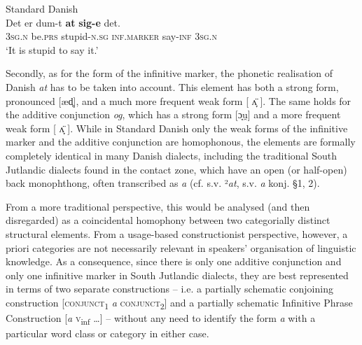 \documentclass[output=paper]{langsci/langscibook}
\begin{document}
\ea\label{ex:hoeder:9}
	Standard Danish\\
	\gll Det er dum-t \textbf{at} \textbf{sig-e} det.\\
     3\textsc{sg.n} be.\textsc{prs} stupid-\textsc{n.sg} \textsc{inf.marker} say-\textsc{inf} 3\textsc{sg.n}\\
	\glt `It is stupid to say it.'
\z

Secondly, as for the form of the infinitive marker, the phonetic realisation of Danish \textit{at} has to be taken into account. This element has both a strong form, pronounced {[}æd̥{]}, and a much more frequent weak form
[%
 ʌ̞̈%
]. The same holds for the additive conjunction \textit{og}, which has a strong form {[}ɔ̞u̯{]} and a more frequent weak form
[%
 ʌ̞̈%
].
While in Standard Danish only the weak forms of the infinitive marker and the additive conjunction are homophonous, the elements are formally completely identical in many Danish dialects, including the traditional South Jutlandic dialects found in the contact zone, which have an open (or half-open) back monophthong, often transcribed as \textit{a} (cf. \citealt{Rasmussen.1965} s.v. ²\textit{at}, \citealt{BjerrumBjerrum1974} s.v. \textit{a} konj. \S 1, 2).

From a more traditional perspective, this would be analysed (and then disregarded) as a coincidental homophony between two categorially distinct structural elements. From a usage-based constructionist perspective, however, a priori categories are not necessarily relevant in speakers’ organisation of linguistic knowledge. As a consequence, since there is only one additive conjunction and only one infinitive marker in South Jutlandic dialects, they are best represented in terms of two separate constructions – i.e. a partially schematic conjoining construction {[}\textsc{conjunct}\textsc{\textsubscript{1}} \textit{a} \textsc{conjunct}\textsc{\textsubscript{2}}{]} and a partially schematic Infinitive Phrase Construction {[}\textit{a} \textsc{v}\textsubscript{inf} …{]} – without any need to identify the form \textit{a} with a particular word class or category in either case.

\newpage
\end{document}
